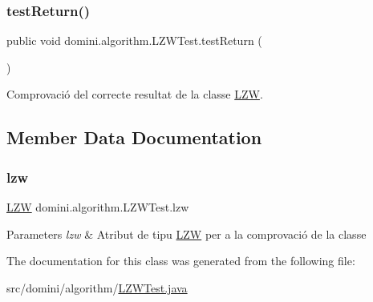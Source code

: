 \subsubsection{\texorpdfstring{test\+Return()}{testReturn()}}
{\footnotesize\ttfamily public void domini.\+algorithm.\+L\+Z\+W\+Test.\+test\+Return (\begin{DoxyParamCaption}{ }\end{DoxyParamCaption})\hspace{0.3cm}{\ttfamily [inline]}}



Comprovació del correcte resultat de la classe \hyperlink{classdomini_1_1algorithm_1_1LZW}{L\+ZW}. 



\subsection{Member Data Documentation}
\mbox{\label{classdomini_1_1algorithm_1_1LZWTest_a591c1bb9b927631d0e60a2853e502d20}} 
\subsubsection{\texorpdfstring{lzw}{lzw}}
{\footnotesize\ttfamily \hyperlink{classdomini_1_1algorithm_1_1LZW}{L\+ZW} domini.\+algorithm.\+L\+Z\+W\+Test.\+lzw\hspace{0.3cm}{\ttfamily [private]}}


\begin{DoxyParams}{Parameters}
{\em lzw} & Atribut de tipu \hyperlink{classdomini_1_1algorithm_1_1LZW}{L\+ZW} per a la comprovació de la classe \\
\hline
\end{DoxyParams}


The documentation for this class was generated from the following file\+:\begin{DoxyCompactItemize}
\item 
src/domini/algorithm/\hyperlink{LZWTest_8java}{L\+Z\+W\+Test.\+java}\end{DoxyCompactItemize}
